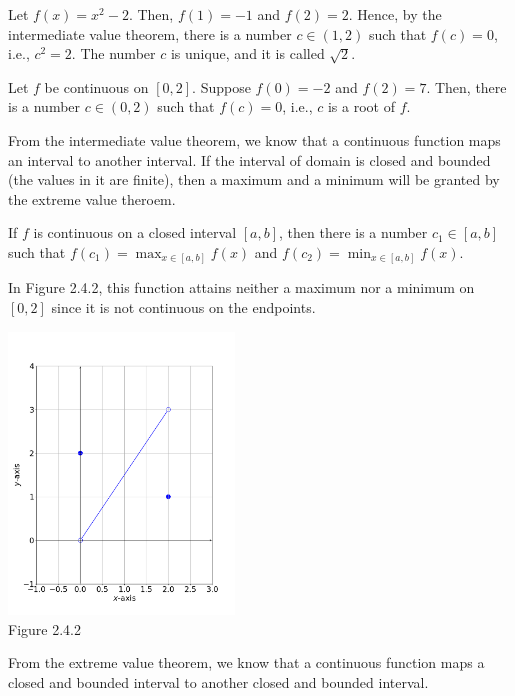 \documentclass[11pt]{book}
\theoremstyle{break}
\theoremstyle{no_label}
\newcommand{\figtag}[1]{\\[-1.2em]Figure {#1}}
\numberwithin{equation}{section}
\begin{document}
\begin{example}
    Let $f(x)=x^2-2$. Then, $f(1)=-1$ and $f(2)=2$. Hence, by the intermediate value theorem, there is a number $c\in(1, 2)$ such that $f(c)=0$, i.e., $c^2=2$. The number $c$ is unique, and it is called $\sqrt{2}$.
\end{example}

\begin{example}
    Let $f$ be continuous on $[0, 2]$. Suppose $f(0)=-2$ and $f(2)=7$. Then, there is a number $c\in(0, 2)$ such that $f(c)=0$, i.e., $c$ is a root of $f$.
\end{example}

From the intermediate value theorem, we know that a continuous function maps an interval to another interval. If the interval of domain is closed and bounded (the values in it are finite), then a maximum and a minimum will be granted by the extreme value theroem.

\begin{theorem}
    If $f$ is continuous on a closed interval $[a, b]$, then there is a number $c_1\in[a, b]$ such that $\displaystyle f(c_1)=\max_{x\in[a, b]}f(x)$ and $\displaystyle f(c_2)=\min_{x\in[a, b]}f(x)$.
\end{theorem}

\begin{example}
    In Figure 2.4.2, this function attains neither a maximum nor a minimum on $[0, 2]$ since it is not continuous on the endpoints.
\end{example}

\begin{center}
    \includegraphics[width=0.45\textwidth]{evt.png}\figtag{2.4.2}
\end{center}

From the extreme value theorem, we know that a continuous function maps a closed and bounded interval to another closed and bounded interval.
\end{document}
